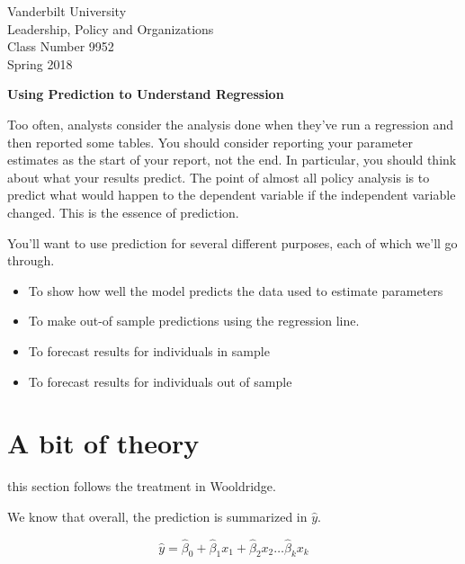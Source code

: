 \documentclass[12pt]{article}
\begin{document}
\thispagestyle{empty}%

\setlength{\parskip}{1ex plus 0.5ex minus 0.2ex}

\setcounter{secnumdepth}{-2}

\begin{flushleft}
Vanderbilt University\\Leadership, Policy and Organizations\\Class Number 9952\\ Spring 2018\\
\end{flushleft}

\begin{center}
  \textbf{Using Prediction to Understand Regression}
\end{center}


Too often, analysts consider the analysis done when they've run a
regression and then reported some tables. You should consider
reporting your parameter estimates as the start of your report, not
the end. In particular, you should think about what your results
predict. The point of almost all policy analysis is to predict what
would happen to the dependent variable if the independent variable
changed. This is the essence of prediction. 

You'll want to use prediction for several different purposes, each of
which we'll go through.

\begin{itemize}
\item To show how well the model predicts the data used to estimate
  parameters
\item To make out-of sample predictions using the regression line.
\item To forecast results for individuals in sample
\item To forecast results for individuals out of sample
\end{itemize}



\section{A bit of theory}
\label{sec:bit-theory}

this section follows the treatment in Wooldridge. 

We know that overall, the prediction is summarized in $\hat{y}$. 

\begin{equation*}
  \hat{y}=\hat{\beta}_0+\hat{\beta}_1 x_1+ \hat{\beta}_2 x_2 \ldots \hat{\beta}_k x_k
\end{equation*}
\end{document}
